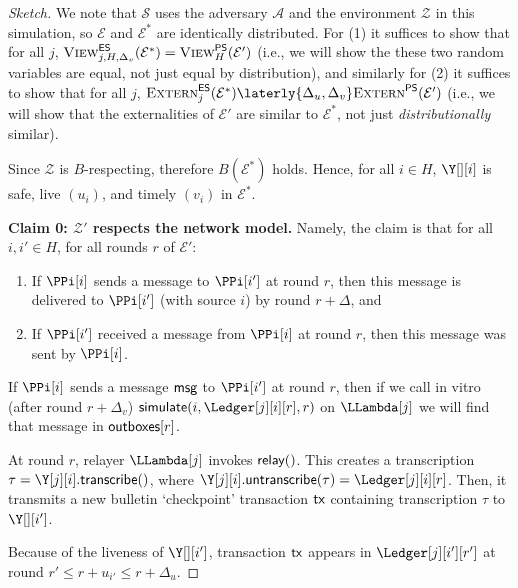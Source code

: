 \begin{proof}[Sketch]

  We note that $\mathcal{S}$ uses the adversary $\mathcal{A}$ and the
  environment $\mathcal{Z}$ in this simulation, so $\mathcal{E}$
  and $\mathcal{E}^*$ are identically distributed.
  For (1) it suffices to show that for all $j$,
  $\textsc{View}^{\textsf{ES}}_{j,H,\Delta_v}(\mathcal{E}^*) = \textsc{View}^{\textsf{PS}}_H(\mathcal{E}')$
  (i.e., we will show the these two random variables are equal,
  not just equal by distribution),
  and similarly for (2) it suffices to show that for all $j$,
  $\LCExtern_j(\mathcal{E}^*) \laterly{\Delta_u,\Delta_v} \PEExtern(\mathcal{E}')$
  (i.e., we will show that the externalities of $\mathcal{E}'$ are
  similar to $\mathcal{E}^*$, not just \emph{distributionally} similar).

  Since $\mathcal{Z}$ is $B$-respecting, therefore $B(\mathcal{E}^*)$ holds.
  Hence, for all $i \in H$, $\Y[][i]$ is safe, live $(u_i)$, and timely $(v_i)$
  in $\mathcal{E}^*$.

  \noindent
  \textbf{Claim 0: $\mathcal{Z}'$ respects the network model.}
  Namely, the claim is that for all $i, i' \in H$, for all rounds $r$ of $\mathcal{E}'$:

  \begin{enumerate}[label=(\alph*)]
    \item
    \label{conj:simulation:claim-delta}
    If $\PPi[i]$ sends a message to $\PPi[i']$ at round $r$, then this message is delivered to $\PPi[i']$ (with source $i$) by round $r + \Delta$, and

    \item
    If $\PPi[i']$ received a message from $\PPi[i]$ at round $r$, then this message was sent by $\PPi[i]$.
  \end{enumerate}

  If $\PPi[i]$ sends a message $\textsf{msg}$ to $\PPi[i']$ at round $r$, then
  if we call in vitro (after round $r + \Delta_v$) $\simulate(i, \Ledger[j][i][r], r)$
  on $\LLambda[j]$ we will find that message in $\textsf{outboxes}[r]$.

  At round $r$, relayer $\LLambda[j]$ invokes $\textsf{relay}()$.
  This creates a transcription $\tau = \Y[j][i].\transcribe()$, where
  $\Y[j][i].\untranscribe(\tau) = \Ledger[j][i][r]$.
  Then, it transmits a new bulletin `checkpoint'
  transaction $\textsf{tx}$ containing transcription $\tau$ to $\Y[][i']$.

  Because of the liveness of $\Y[][i']$,
  transaction $\textsf{tx}$ appears in $\Ledger[j][i'][r']$
  at round $r' \leq r + u_{i'} \leq r + \Delta_u$.


\end{proof}
